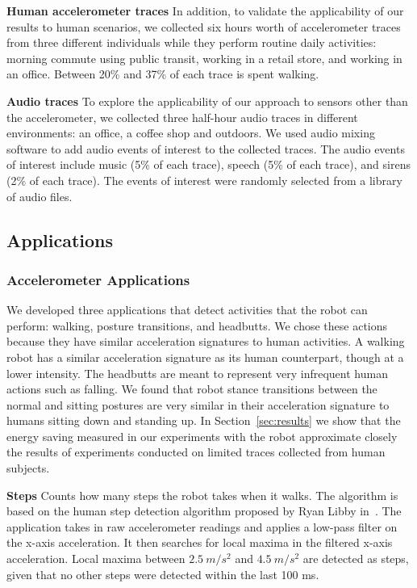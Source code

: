 {\bf Human accelerometer traces}
In addition, to validate the applicability of our results to human
scenarios, we collected six hours worth of accelerometer traces from
three different individuals while they perform routine daily
activities: morning commute using public transit, working in a retail
store, and working in an office.  Between 20\% and 37\% of each trace
is spent walking.

{\bf Audio traces} 
To explore the applicability of our approach to sensors other than 
the accelerometer, we collected three half-hour audio traces in
different environments: an office, a coffee shop and outdoors.  We
used audio mixing software to add audio events of interest to the
collected traces.  The audio events of interest include music (5\%
of each trace), speech (5\% of each trace), and sirens (2\% of each 
trace).  The events of interest were randomly selected from a library
of audio files.

\subsection{Applications}

\subsubsection{Accelerometer Applications}

We developed three applications that detect activities that the robot
can perform: walking, posture transitions, and headbutts.  
We chose these
actions because they have similar acceleration signatures to human
activities.  A walking robot has a similar acceleration signature as
its human counterpart, though at a lower intensity.  The headbutts are
meant to represent very infrequent human actions such as falling.  We
found that robot stance transitions between the normal and sitting
postures are very similar in their acceleration signature to humans
sitting down and standing up.  In Section~\ref{sec:results} we show
that the energy saving measured in our experiments with the robot
approximate closely the results of experiments conducted on limited
traces collected from human subjects.

{\bf Steps} Counts how many steps the robot takes when it
  walks. The algorithm is based on the human step detection algorithm
  proposed by Ryan Libby in~\cite{libbyFootstepDetection}. The
  application takes in raw accelerometer readings and applies a
  low-pass filter on the x-axis acceleration. It then searches for
  local maxima in the filtered x-axis acceleration. Local maxima
  between $2.5\:m/s^2$ and $4.5\:m/s^2$ are detected as steps, given
  that no other steps were detected within the last 100 ms.

